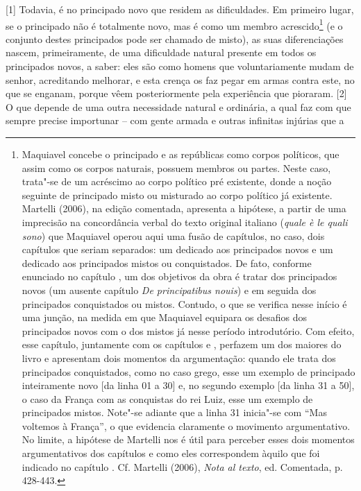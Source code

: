 {[}1{]} Todavia, é no principado novo que residem as dificuldades. Em
primeiro lugar, se o principado não é totalmente novo, mas é como um
membro acrescido\footnote{Maquiavel concebe o principado e as repúblicas
  como corpos políticos, que assim como os corpos naturais, possuem
  membros ou partes. Neste caso, trata"-se de um acréscimo ao corpo
  político pré existente, donde a noção seguinte de principado misto ou
  misturado ao corpo político já existente. Martelli (2006), na edição
  comentada, apresenta a hipótese, a partir de uma imprecisão na
  concordância verbal do texto original italiano (\emph{quale è le quali
  sono}) que Maquiavel operou aqui uma fusão de capítulos, no caso, dois
  capítulos que seriam separados: um dedicado aos principados novos e um
  dedicado aos principados mistos ou conquistados. De fato, conforme
  enunciado no capítulo , um dos objetivos da obra é tratar dos
  principados novos (um ausente capítulo \emph{De principatibus nouis})
  e em seguida dos principados conquistados ou mistos. Contudo, o que se
  verifica nesse início é uma junção, na medida em que Maquiavel
  equipara os desafios dos principados novos com o dos mistos já nesse
  período introdutório. Com efeito, esse capítulo, juntamente com os
  capítulos  e , perfazem um dos maiores do livro e apresentam
  dois momentos da argumentação: quando ele trata dos principados
  conquistados, como no caso grego, esse um exemplo de principado
  inteiramente novo {[}da linha 01 a 30{]} e, no segundo exemplo {[}da
  linha 31 a 50{]}, o caso da França com as conquistas do rei Luiz, esse
  um exemplo de principados mistos. Note"-se adiante que a linha 31
  inicia"-se com ``Mas voltemos à França'', o que evidencia claramente o
  movimento argumentativo. No limite, a hipótese de Martelli nos é útil
  para perceber esses dois momentos argumentativos dos capítulos e como
  eles correspondem àquilo que foi indicado no capítulo . Cf. Martelli
  (2006), \emph{Nota al texto}, ed. Comentada, p. 428-443.} (e o
conjunto destes principados pode ser chamado de misto), as suas
diferenciações nascem, primeiramente, de uma dificuldade natural
presente em todos os principados novos, a saber: eles são como homens
que voluntariamente mudam de senhor, acreditando melhorar, e esta crença
os faz pegar em armas contra este, no que se enganam, porque vêem
posteriormente pela experiência que pioraram. {[}2{]} O que depende de
uma outra necessidade natural e ordinária, a qual faz com que sempre
precise importunar -- com gente armada e outras infinitas injúrias que a
